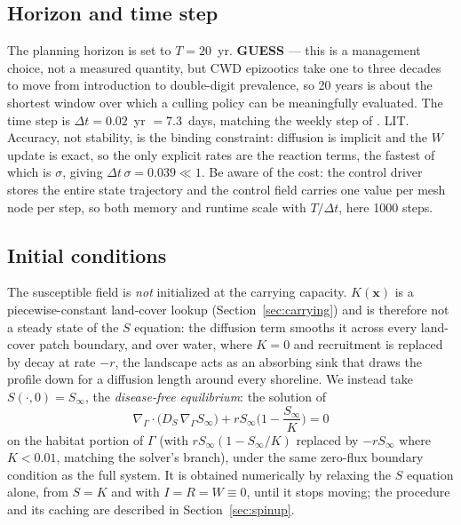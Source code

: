\documentclass[11pt]{article}
\newcommand{\tagLIT}{{\footnotesize\textsf{\textcolor{green!40!black}{LIT}}}}
\newcommand{\tagGUESS}{{\footnotesize\textsf{\textbf{\textcolor{red!70!black}{GUESS}}}}}
\newcommand{\Grad}{\nabla_\Gamma}
\newcommand{\Div}{\nabla_\Gamma\cdot}
\begin{document}
\subsection{Horizon and time step}

The planning horizon is set to $T = 20$~yr. \tagGUESS{} --- this is a management choice, not a measured quantity, but CWD epizootics take one to three decades to move from introduction to double-digit prevalence, so 20 years is about the shortest window over which a culling policy can be meaningfully evaluated. The time step is $\Delta t = 0.02$~yr $= 7.3$~days, matching the weekly step of \citet{Almberg2011}. \tagLIT{}. Accuracy, not stability, is the binding constraint: diffusion is implicit and the $W$ update is exact, so the only explicit rates are the reaction terms, the fastest of which is $\sigma$, giving $\Delta t\,\sigma = 0.039 \ll 1$. Be aware of the cost: the control driver stores the entire state trajectory and the control field carries one value per mesh node per step, so both memory and runtime scale with $T/\Delta t$, here 1000 steps.

\subsection{Initial conditions}
\label{sec:params-ic}

The susceptible field is \emph{not} initialized at the carrying capacity. $K(\mathbf{x})$ is a piecewise-constant land-cover lookup (Section~\ref{sec:carrying}) and is therefore not a steady state of the $S$ equation: the diffusion term smooths it across every land-cover patch boundary, and over water, where $K=0$ and recruitment is replaced by decay at rate $-r$, the landscape acts as an absorbing sink that draws the profile down for a diffusion length around every shoreline. We instead take $S(\cdot,0)=S_\infty$, the \emph{disease-free equilibrium}: the solution of
\begin{equation}
\Div\big(D_S\,\Grad S_\infty\big) + rS_\infty\Big(1-\frac{S_\infty}{K}\Big) = 0
\label{eq:disease-free}
\end{equation}
on the habitat portion of $\Gamma$ (with $rS_\infty(1-S_\infty/K)$ replaced by $-rS_\infty$ where $K<0.01$, matching the solver's branch), under the same zero-flux boundary condition as the full system. It is obtained numerically by relaxing the $S$ equation alone, from $S=K$ and with $I=R=W\equiv0$, until it stops moving; the procedure and its caching are described in Section~\ref{sec:spinup}.
\end{document}
